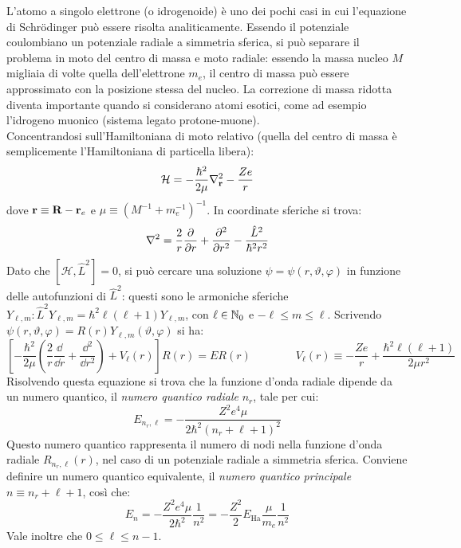 L'atomo a singolo elettrone (o idrogenoide) è uno dei pochi casi in cui l'equazione di Schrödinger può essere risolta analiticamente. Essendo il potenziale coulombiano un potenziale radiale a simmetria sferica, si può separare il problema in moto del centro di massa e moto radiale: essendo la massa nucleo $ M $ migliaia di volte quella dell'elettrone $ m_e $, il centro di massa può essere approssimato con la posizione stessa del nucleo. La correzione di massa ridotta diventa importante quando si considerano atomi esotici, come ad esempio l'idrogeno muonico (sistema legato protone-muone).\\
Concentrandosi sull'Hamiltoniana di moto relativo (quella del centro di massa è semplicemente l'Hamiltoniana di particella libera):
\begin{equation}
	\mathcal{H} = - \frac{\hbar^2}{2\mu} \nabla_{\mathbf{r}}^2 - \frac{Ze}{r}
	\label{eq:1-e-ham}
\end{equation}
dove $ \mathbf{r} \equiv \mathbf{R} - \mathbf{r}_e $ e $ \mu \equiv (M^{-1} + m_e^{-1})^{-1} $. In coordinate sferiche si trova:
\begin{equation*}
	\nabla^2 = \frac{2}{r} \frac{\partial}{\partial r} + \frac{\partial^2}{\partial r^2} - \frac{\hat{L}^2}{\hbar^2 r^2}
\end{equation*}
Dato che $ [\mathcal{H} , \hat{L}^2] = 0 $, si può cercare una soluzione $ \psi = \psi(r,\vartheta,\varphi) $ in funzione delle autofunzioni di $ \hat{L}^2 $: questi sono le armoniche sferiche $ Y_{\ell,m} : \hat{L}^2 Y_{\ell,m} = \hbar^2 \ell (\ell + 1) Y_{\ell,m} $, con $ \ell \in \mathbb{N}_0 $ e $ -\ell \le m \le \ell $. Scrivendo $ \psi(r,\vartheta,\varphi) = R(r) Y_{\ell,m}(\vartheta,\varphi) $ si ha:
\begin{equation}
	\left[ - \frac{\hbar^2}{2\mu} \left( \frac{2}{r} \frac{\dd}{\dd r} + \frac{\dd^2}{\dd r^2} \right) + V_\ell(r) \right] R(r) = E R(r)
	\qquad \qquad
	V_\ell(r) \equiv - \frac{Ze}{r} + \frac{\hbar^2 \ell(\ell + 1)}{2\mu r^2}
	\label{eq:1-e-rad-eq}
\end{equation}
Risolvendo questa equazione si trova che la funzione d'onda radiale dipende da un numero quantico, il \textit{numero quantico radiale} $ n_r $, tale per cui:
\begin{equation*}
	E_{n_r,\ell} = - \frac{Z^2 e^4 \mu}{2\hbar^2 (n_r + \ell + 1)^2}
\end{equation*}
Questo numero quantico rappresenta il numero di nodi nella funzione d'onda radiale $ R_{n_r,\ell}(r) $, nel caso di un potenziale radiale a simmetria sferica. Conviene definire un numero quantico equivalente, il \textit{numero quantico principale} $ n \equiv n_r + \ell + 1 $, così che:
\begin{equation}
	E_n = - \frac{Z^2 e^4 \mu}{2\hbar^2} \frac{1}{n^2} = - \frac{Z^2}{2} E_\text{Ha} \frac{\mu}{m_e} \frac{1}{n^2}
	\label{eq:1-e-en}
\end{equation}
Vale inoltre che $ 0 \le \ell \le n-1 $.


